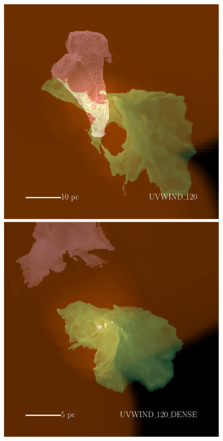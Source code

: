 \documentclass[a4paper,fleqn,usenatbib]{mnras}
\begin{document}
\begin{figure}
	\includegraphics[width=0.99\columnwidth]{../plots/vis/multiray/multirayTime_coolemission_ionemission_xrayemission2__windset_120Msun0p2Myr_zoom0p5__ywindonly.pdf} \includegraphics[width=0.99\columnwidth]{../plots/vis/multiray/multirayTime_coolemission_ionemission_xrayemission2__windset_120Msun_dense0p2Myr_zoom1p0__ywindonly.pdf}

\end{figure}
\end{document}
